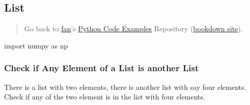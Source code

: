 \documentclass[
]{book}
\newenvironment{Shaded}{\begin{snugshade}}{\end{snugshade}}
\newcommand{\ImportTok}[1]{#1}
\newcommand{\NormalTok}[1]{#1}
\begin{document}
\hypertarget{list}{%
\subsection{List}\label{list}}

\begin{quote}
Go back to \href{http://fanwangecon.github.io/}{fan}'s \href{https://fanwangecon.github.io/pyfan/}{Python Code Examples} Repository (\href{https://fanwangecon.github.io/pyfan/bookdown}{bookdown site}).
\end{quote}

\begin{Shaded}
\begin{Highlighting}[]
\ImportTok{import}\NormalTok{ numpy }\ImportTok{as}\NormalTok{ np}
\end{Highlighting}
\end{Shaded}

\hypertarget{check-if-any-element-of-a-list-is-another-list}{%
\subsubsection{Check if Any Element of a List is another List}\label{check-if-any-element-of-a-list-is-another-list}}

There is a list with two elements, there is another list with say four elements. Check if any of the two element is in the list with four elements.
\end{document}
